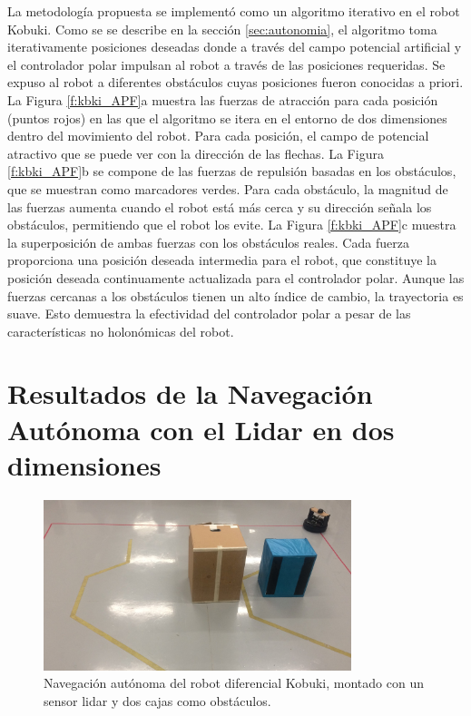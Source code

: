 La metodología propuesta se implementó como un algoritmo iterativo en el robot Kobuki. 
Como se se describe en la sección \ref{sec:autonomia}, el algoritmo toma iterativamente 
posiciones deseadas  donde a través del campo potencial artificial y el controlador 
polar impulsan al robot a través de las posiciones requeridas. Se expuso al robot 
a diferentes obstáculos cuyas posiciones fueron conocidas a priori. La Figura 
\ref{f:kbki_APF}a muestra las fuerzas de atracción para cada posición (puntos rojos) en 
las que el algoritmo se itera en el entorno de dos dimensiones dentro del movimiento del 
robot. Para cada posición, el campo de potencial atractivo que se puede ver con la dirección 
de las flechas. La Figura \ref{f:kbki_APF}b se compone de las fuerzas de repulsión basadas en 
los obstáculos, que se muestran como marcadores verdes. Para cada obstáculo, la magnitud de 
las fuerzas aumenta cuando el robot está más cerca y su dirección señala los obstáculos, permitiendo 
que el robot los evite. La Figura \ref{f:kbki_APF}c muestra la superposición de ambas fuerzas 
con los obstáculos reales. Cada fuerza proporciona una posición deseada intermedia para el 
robot, que constituye la posición deseada continuamente actualizada para el controlador 
polar. Aunque las fuerzas cercanas a los obstáculos tienen un alto índice de cambio, la 
trayectoria es suave. Esto demuestra la efectividad del controlador polar a pesar de las 
características no holonómicas del robot.

\section{Resultados de la Navegación Autónoma con el Lidar en dos dimensiones}
\begin{figure}%
  \centering \footnotesize
  \includegraphics[width=0.80\textwidth]{images/kobuki_201.jpg}
  \captionsetup{font=footnotesize}
  \caption{Navegación autónoma del robot diferencial Kobuki, montado con un sensor lidar y dos cajas
  como obstáculos.}
\end{figure}

